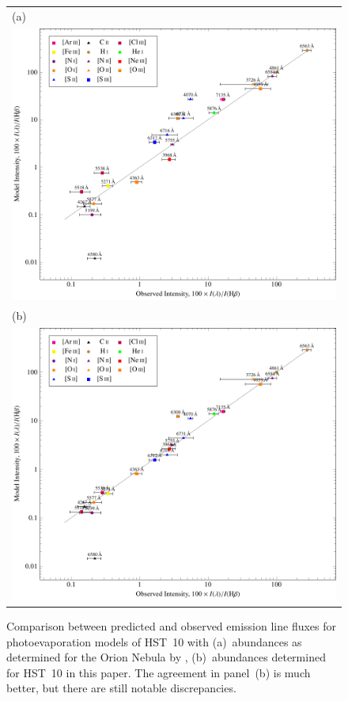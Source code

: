 \documentclass[useAMS,usenatbib]{mn2e}
\begin{document}
\begin{figure}
  \setlength\tabcolsep{0pt}
  \centering
  \begin{tabular}{l} 
    (a)\\
    \includegraphics[]{ratios-figure-figure0.pdf}\\
    (b)\\
    \includegraphics[]{ratios-figure-figure1.pdf}
  \end{tabular}
  \caption{Comparison between predicted and observed emission line fluxes 
    for photoevaporation models of HST~10 with 
    (a)~abundances as determined for the Orion Nebula by \protect\citet{2004MNRAS.355..229E},
    (b)~abundances determined for HST~10 in this paper.  
    The agreement in panel~(b) is much better, but there are still notable discrepancies.
  }
  \label{fig:models}
\end{figure}
\end{document}
